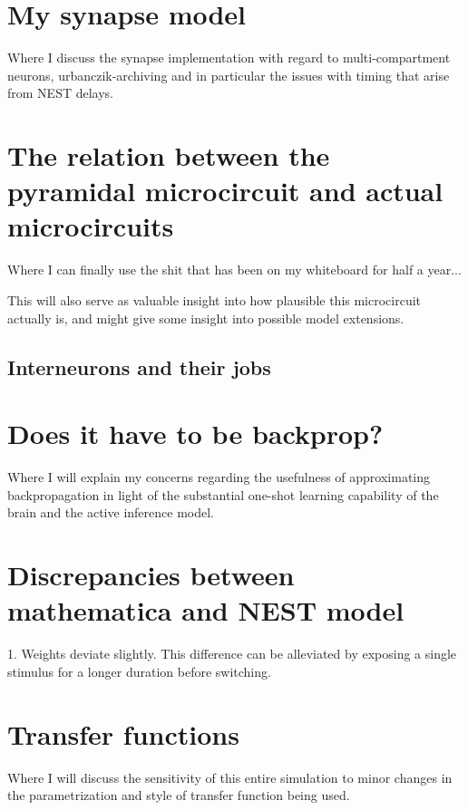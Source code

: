 \documentclass[12pt,a4paper,titlepage]{report}
\begin{document}
\section{My synapse model}

Where I discuss the synapse implementation with regard to multi-compartment neurons,
urbanczik-archiving and in particular the issues with timing that arise from NEST delays.


\section{The relation between the pyramidal microcircuit and actual microcircuits}

Where I can finally use the shit that has been on my whiteboard for half a year...

This will also serve as valuable insight into how plausible this microcircuit actually is,
and might give some insight into possible model extensions.

\subsection{Interneurons and their jobs}

\section{Does it have to be backprop?}

Where I will explain my concerns regarding the usefulness of approximating backpropagation
in light of the substantial one-shot learning capability of the brain and the active inference
model.


\section{Discrepancies between mathematica and NEST model}

1. Weights deviate slightly. This difference can be alleviated by exposing a single stimulus for a longer duration before switching.

\section{Transfer functions}

Where I will discuss the sensitivity of this entire simulation to minor changes in the
parametrization and style of transfer function being used.
\end{document}

